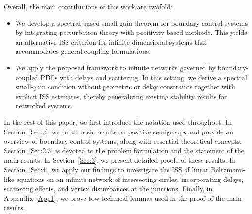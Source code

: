 \documentclass[onecolumn]{autart}
\numberwithin{equation}{section}
\begin{document}
    Overall, the main contributions of this work are twofold:
    \begin{itemize}
    \item[(i)] We develop a {spectral-based small-gain theorem} for boundary control systems by integrating perturbation theory with positivity-based methods. This yields an alternative ISS criterion for infinite-dimensional systems that accommodates general coupling formulations.

   \item[(ii)] We apply the proposed framework to infinite networks governed by boundary-coupled PDEs with delays and scattering. In this setting, we derive a spectral small-gain condition without geometric or delay constraints together with explicit ISS estimates, thereby generalizing existing stability results for networked systems.
   \end{itemize}

    In the rest of this paper, we first introduce the notation used throughout. In Section~\ref{Sec:2}, we recall basic results on positive semigroups and provide an overview of boundary control systems, along with essential theoretical concepts. Section~\ref{Sec:2.3} is devoted to the problem formulation and the statement of the main results. In Section~\ref{Sec:3}, we present detailed proofs of these results. In Section~\ref{Sec:4}, we apply our findings to investigate the ISS of linear Boltzmann-like equations on an infinite network of intersecting circles, incorporating delays, scattering effects, and vertex disturbances at the junctions. Finally, in Appendix~\ref{App1}, we prove tow technical lemmas used in the proof of the main results.




\end{document}
